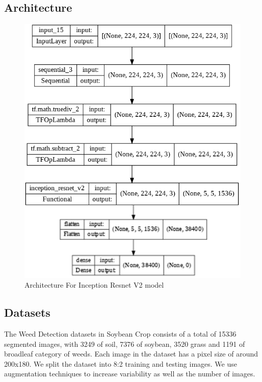 \documentclass{report}
\begin{document}
\subsection{Architecture}
\begin{figure}[H]
\centering
\includegraphics[width=\textwidth]{M4arc.png}
\caption{ Architecture For Inception Resnet V2 model}
\label{fig:Frozen}
\end{figure}
\subsection{Datasets}
The Weed Detection datasets in Soybean Crop consists of a total of 15336 segmented images, with 3249 of soil, 7376 of soybean, 3520 grass and 1191 of broadleaf category of weeds. Each image in the dataset has a pixel size of around 200x180. We split the dataset into 8:2 training and testing images. We use augmentation techniques to increase variability as well as the number of images.  
\end{document}
